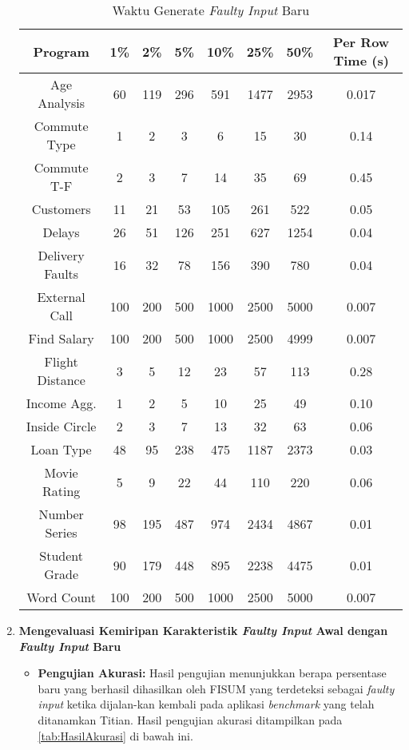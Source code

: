 \begin{enumerate}[topsep=0pt]
      \begin{table}[H]
      \centering
      \caption{Waktu Generate \emph{Faulty Input} Baru}
      \label{tab:WaktuGenerate}
      \begin{tabular}{|c|c|c|c|c|c|c|c|}
      \hline
      \textbf{Program} & \textbf{1\%} & \textbf{2\%} & \textbf{5\%} & \textbf{10\%} & \textbf{25\%} & \textbf{50\%} & \textbf{Per Row Time (s)} \\
      \hline
      Age Analysis & 60 & 119 & 296 & 591 & 1477 & 2953 & 0.017\\
      \hline
      Commute Type & 1 & 2 & 3 & 6 & 15 & 30 & 0.14 \\
      \hline
      Commute T-F & 2 & 3 & 7 & 14 & 35 & 69 & 0.45 \\
      \hline
      Customers & 11 & 21 & 53 & 105 & 261 & 522 & 0.05 \\
      \hline
      Delays & 26 & 51 & 126 & 251 & 627 & 1254 & 0.04 \\
      \hline
      Delivery Faults & 16 & 32 & 78 & 156 & 390 & 780 & 0.04 \\
      \hline
      External Call & 100 & 200 & 500 & 1000 & 2500 & 5000 & 0.007 \\
      \hline
      Find Salary & 100 & 200 & 500 & 1000 & 2500 & 4999 & 0.007 \\
      \hline
      Flight Distance & 3 & 5 & 12 & 23 & 57 & 113 & 0.28 \\
      \hline
      Income Agg. & 1 & 2 & 5 & 10 & 25 & 49 & 0.10 \\
      \hline
      Inside Circle & 2 & 3 & 7 & 13 & 32 & 63 & 0.06 \\
      \hline
      Loan Type & 48 & 95 & 238 & 475 & 1187 & 2373 & 0.03 \\
      \hline
      Movie Rating & 5 & 9 & 22 & 44 & 110 & 220 & 0.06 \\
      \hline
      Number Series & 98 & 195 & 487 & 974 & 2434 & 4867 & 0.01 \\
      \hline
      Student Grade & 90 & 179 & 448 & 895 & 2238 & 4475 & 0.01 \\
      \hline
      Word Count & 100 & 200 & 500 & 1000 & 2500 & 5000 & 0.007 \\
      \hline
      \end{tabular}
      \end{table}
  
      \item \textbf{Mengevaluasi Kemiripan Karakteristik \emph{Faulty Input} Awal dengan \emph{Faulty Input} Baru}
      \begin{itemize}
            \item \textbf{Pengujian Akurasi:} Hasil pengujian menunjukkan berapa persentase baru 
            yang berhasil dihasilkan oleh FISUM yang terdeteksi sebagai \emph{faulty input} ketika
            dijalan-kan kembali pada aplikasi \emph{benchmark} yang telah ditanamkan
            Titian.
            Hasil pengujian akurasi ditampilkan pada \ref{tab:HasilAkurasi} di bawah ini.
      \end{itemize}
      

\end{enumerate}

